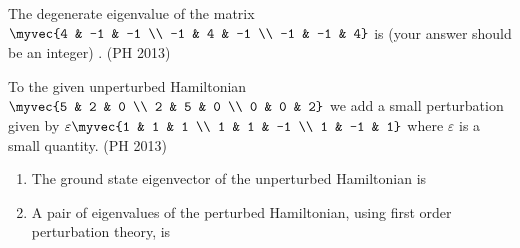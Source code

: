 \item The degenerate eigenvalue of the matrix
$\myvec{4 & -1 & -1 \\ -1 & 4 & -1 \\ -1 & -1 & 4}$
is (your answer should be an integer) \underline{\hspace{1cm}}.
\hfill (PH 2013)
\item  To the given unperturbed Hamiltonian
	$
\myvec{5 & 2 & 0 \\ 2 & 5 & 0 \\ 0 & 0 & 2}
$
we add a small perturbation given by
$
\varepsilon \myvec{1 & 1 & 1 \\ 1 & 1 & -1 \\ 1 & -1 & 1}
$
where $\varepsilon$ is a small quantity.
\hfill (PH 2013)
\begin{enumerate}
\item The ground state eigenvector of the unperturbed Hamiltonian is
\begin{enumerate}
\end{enumerate}
\item A pair of eigenvalues of the perturbed Hamiltonian, using first order perturbation theory, is
\begin{enumerate}
\end{enumerate}
\end{enumerate}

